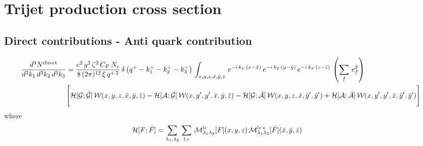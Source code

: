 \documentclass[9pt]{article}
\numberwithin{equation}{section}
\begin{document}
\section{Trijet production cross section}
\subsection{Direct contributions - Anti quark contribution}
\begin{align}
     \frac{d^{3}N^{\text{direct}}}{d^{3}k_{1}\,d^{3}k_{2}\, d^{3}k_{3}} & = \frac{e^{2}\,g^{2}\,\zeta^{2}\,C_{F}\,N_{c}}{8\, (2\pi)^{12}\,\xi\,q^{+\,2}}\,  \delta\left(q^{+}-k^{+}_{1}-k^{+}_{2}-k^{+}_{3}\right)\, \int_{x,y,z,\Bar{x},\Bar{y},\Bar{z}}\, e^{-i\,k_{1}\cdot (x-\Bar{x})}\, e^{-i\,k_{2}\cdot (y-\Bar{y})}\, e^{-i\,k_{3}\cdot (z-\Bar{z})}\,\left(\sum_{f}\, e^{2}_{f}\right)\,\notag \\ & \Bigg[\mathcal{H}[\mathcal{G};\mathcal{\Bar{G}}]\,\mathcal{W}(x,y,z,\Bar{x},\Bar{y},\Bar{z})-\mathcal{H}[\mathcal{A};\mathcal{\Bar{G}}]\,\mathcal{W}(x,y',y',\Bar{x},\Bar{y},\Bar{z})-\mathcal{H}[\mathcal{G};\mathcal{\Bar{A}}]\,\mathcal{W}(x,y,z,\Bar{x},\Bar{y}',\Bar{y}')+\mathcal{H}[\mathcal{A};\mathcal{\Bar{A}}]\,\mathcal{W}(x,y',y',\Bar{x},\Bar{y}',\Bar{y}')\Bigg]
\end{align}
where
\begin{align}
    \mathcal{H}[F;\Bar{F}] & = \sum_{\lambda_{1},\lambda_{2}}\,\sum_{l,r}\, \mathcal{M}^{lr}_{\lambda_{1}\lambda_{2}}[F](x,y,z)\,\mathcal{M}^{lr\,*}_{\lambda_{1}\lambda_{2}}[\Bar{F}](\Bar{x},\Bar{y},\Bar{z})
\end{align}
\end{document}
